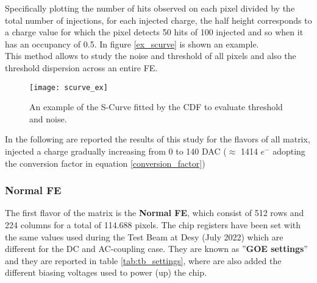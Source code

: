 Specifically plotting the number of hits observed on each pixel divided by the total number of injections, for each injected charge, the half height corresponds to a charge value for which the pixel detects 50 hits of 100 injected and so when it has an occupancy of 0.5. In figure \vref{ex_scurve} is shown an example. \\

This method allows to study the noise and threshold of all pixels and also the threshold dispersion across an entire FE.



\begin{figure}
\centering
\texttt{[image: scurve\_ex]}
\caption{An example of the S-Curve fitted by the CDF to evaluate threshold and noise.}
\label{ex_scurve}
\end{figure}

In the following are reported the results of this study for the flavors of all matrix, injected a charge gradually increasing from 0 to 140 DAC ($\approx$ 1414 $e^{-}$ adopting the conversion factor in equation \ref{conversion_factor})



\subsubsection{Normal FE}


The first flavor of the matrix is the \textbf{Normal FE}, which consist of 512 rows and 224 columns for a total of 114.688 pixels. The chip registers have been set with the same values used during the Test Beam at Desy (July 2022) which are different for the DC and AC-coupling case. They are known as ''\textbf{GOE settings}'' and they are reported in table \vref{tab:tb_settings}, where are also added the different biasing voltages used to power (up) the chip.


